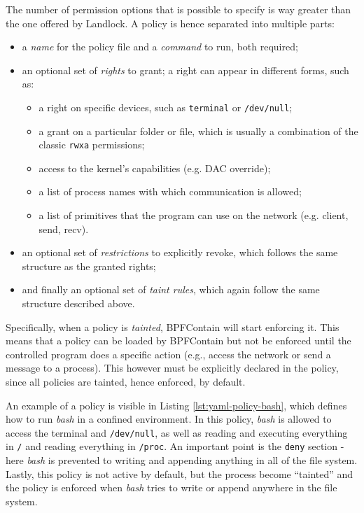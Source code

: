 The number of permission options that is possible to specify is way greater than the one offered by Landlock.
A policy is hence separated into multiple parts:
\begin{itemize}
  \item a \textit{name} for the policy file and a \textit{command} to run, both required;
  \item an optional set of \textit{rights} to grant; a right can appear in different forms, such as:
        \begin{itemize}
          \item a right on specific devices, such as \texttt{terminal} or \texttt{/dev/null};
          \item a grant on a particular folder or file, which is usually a combination of the classic \texttt{rwxa} permissions;
          \item access to the kernel's capabilities (e.g. DAC override);
          \item a list of process names with which communication is allowed;
          \item a list of primitives that the program can use on the network (e.g. client, send, recv).
        \end{itemize}
  \item an optional set of \textit{restrictions} to explicitly revoke, which follows the same structure as the
        granted rights;
  \item and finally an optional set of \textit{taint rules}, which again follow the same structure described above.
\end{itemize}

Specifically, when a policy is \textit{tainted}, BPFContain will start enforcing it. This means that a policy
can be loaded by BPFContain but not be enforced until the controlled program does a specific
action (e.g., access the network or send a message to a process).
This however must be explicitly declared in the policy, since all policies are tainted, hence enforced, by default.

An example of a policy is visible in Listing \ref{lst:yaml-policy-bash}, which defines how to
run \textit{bash} in a confined environment.
In this policy, \textit{bash} is allowed to access the terminal and \texttt{/dev/null}, as well
as reading and executing everything in \texttt{/} and reading everything in \texttt{/proc}.
An important point is the \texttt{deny} section - here \textit{bash} is prevented to writing and
appending anything in all of the file system.
Lastly, this policy is not active by default, but the process become ``tainted'' and the policy is enforced
when \textit{bash} tries to write or append anywhere in the file system.

